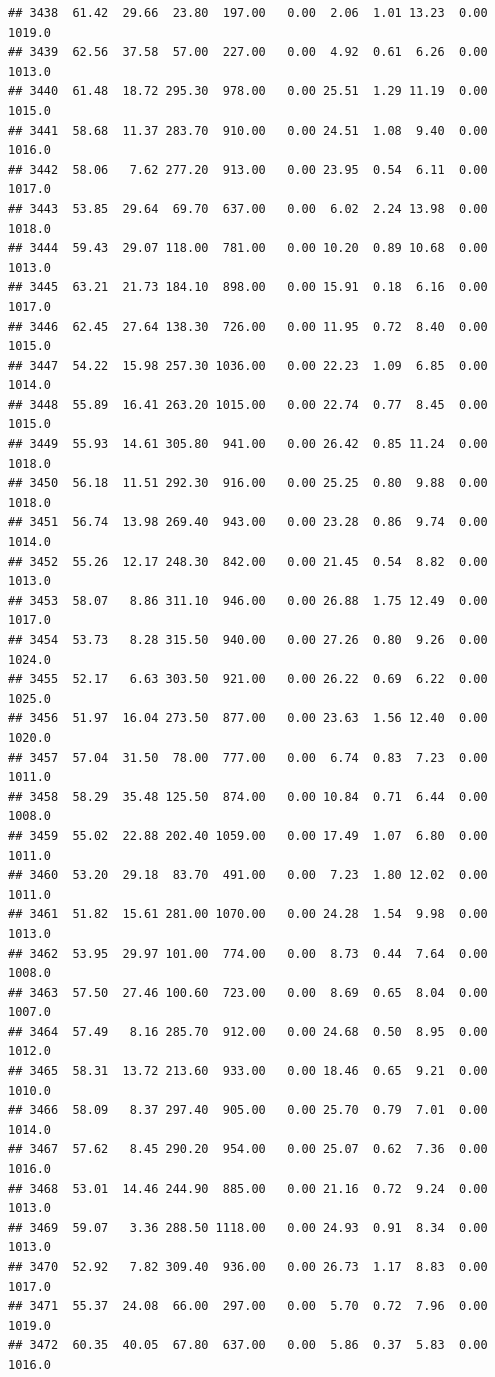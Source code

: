 \documentclass{article}\usepackage{graphicx, color}
\makeatletter
\newenvironment{kframe}{%
 \def\at@end@of@kframe{}%
 \ifinner\ifhmode%
  \def\at@end@of@kframe{\end{minipage}}%
  \begin{minipage}{\columnwidth}%
 \fi\fi%
 \def\FrameCommand##1{\hskip\@totalleftmargin \hskip-\fboxsep
 \colorbox{shadecolor}{##1}\hskip-\fboxsep
     \hskip-\linewidth \hskip-\@totalleftmargin \hskip\columnwidth}%
 \MakeFramed {\advance\hsize-\width
   \@totalleftmargin\z@ \linewidth\hsize
   \@setminipage}}%
 {\par\unskip\endMakeFramed%
 \at@end@of@kframe}
\newenvironment{knitrout}{}{} %
\makeatother
\begin{document}
\begin{knitrout}
\begin{kframe}
\begin{verbatim}
## 3438  61.42  29.66  23.80  197.00   0.00  2.06  1.01 13.23  0.00 1019.0
## 3439  62.56  37.58  57.00  227.00   0.00  4.92  0.61  6.26  0.00 1013.0
## 3440  61.48  18.72 295.30  978.00   0.00 25.51  1.29 11.19  0.00 1015.0
## 3441  58.68  11.37 283.70  910.00   0.00 24.51  1.08  9.40  0.00 1016.0
## 3442  58.06   7.62 277.20  913.00   0.00 23.95  0.54  6.11  0.00 1017.0
## 3443  53.85  29.64  69.70  637.00   0.00  6.02  2.24 13.98  0.00 1018.0
## 3444  59.43  29.07 118.00  781.00   0.00 10.20  0.89 10.68  0.00 1013.0
## 3445  63.21  21.73 184.10  898.00   0.00 15.91  0.18  6.16  0.00 1017.0
## 3446  62.45  27.64 138.30  726.00   0.00 11.95  0.72  8.40  0.00 1015.0
## 3447  54.22  15.98 257.30 1036.00   0.00 22.23  1.09  6.85  0.00 1014.0
## 3448  55.89  16.41 263.20 1015.00   0.00 22.74  0.77  8.45  0.00 1015.0
## 3449  55.93  14.61 305.80  941.00   0.00 26.42  0.85 11.24  0.00 1018.0
## 3450  56.18  11.51 292.30  916.00   0.00 25.25  0.80  9.88  0.00 1018.0
## 3451  56.74  13.98 269.40  943.00   0.00 23.28  0.86  9.74  0.00 1014.0
## 3452  55.26  12.17 248.30  842.00   0.00 21.45  0.54  8.82  0.00 1013.0
## 3453  58.07   8.86 311.10  946.00   0.00 26.88  1.75 12.49  0.00 1017.0
## 3454  53.73   8.28 315.50  940.00   0.00 27.26  0.80  9.26  0.00 1024.0
## 3455  52.17   6.63 303.50  921.00   0.00 26.22  0.69  6.22  0.00 1025.0
## 3456  51.97  16.04 273.50  877.00   0.00 23.63  1.56 12.40  0.00 1020.0
## 3457  57.04  31.50  78.00  777.00   0.00  6.74  0.83  7.23  0.00 1011.0
## 3458  58.29  35.48 125.50  874.00   0.00 10.84  0.71  6.44  0.00 1008.0
## 3459  55.02  22.88 202.40 1059.00   0.00 17.49  1.07  6.80  0.00 1011.0
## 3460  53.20  29.18  83.70  491.00   0.00  7.23  1.80 12.02  0.00 1011.0
## 3461  51.82  15.61 281.00 1070.00   0.00 24.28  1.54  9.98  0.00 1013.0
## 3462  53.95  29.97 101.00  774.00   0.00  8.73  0.44  7.64  0.00 1008.0
## 3463  57.50  27.46 100.60  723.00   0.00  8.69  0.65  8.04  0.00 1007.0
## 3464  57.49   8.16 285.70  912.00   0.00 24.68  0.50  8.95  0.00 1012.0
## 3465  58.31  13.72 213.60  933.00   0.00 18.46  0.65  9.21  0.00 1010.0
## 3466  58.09   8.37 297.40  905.00   0.00 25.70  0.79  7.01  0.00 1014.0
## 3467  57.62   8.45 290.20  954.00   0.00 25.07  0.62  7.36  0.00 1016.0
## 3468  53.01  14.46 244.90  885.00   0.00 21.16  0.72  9.24  0.00 1013.0
## 3469  59.07   3.36 288.50 1118.00   0.00 24.93  0.91  8.34  0.00 1013.0
## 3470  52.92   7.82 309.40  936.00   0.00 26.73  1.17  8.83  0.00 1017.0
## 3471  55.37  24.08  66.00  297.00   0.00  5.70  0.72  7.96  0.00 1019.0
## 3472  60.35  40.05  67.80  637.00   0.00  5.86  0.37  5.83  0.00 1016.0

\end{verbatim}
\end{kframe}
\end{knitrout}
\end{document}
